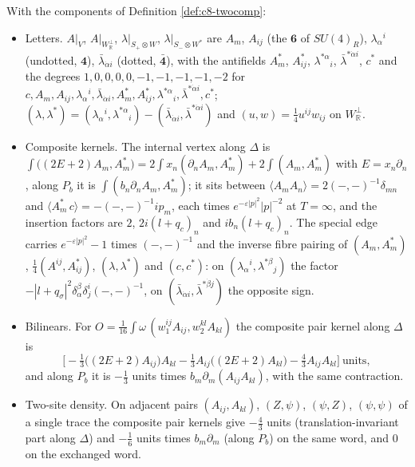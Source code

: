 \begin{remark}
\label{rem:c11-twocomp}
With the components of Definition \ref{def:c8-twocomp}:
\begin{itemize}
\item Letters. $A|_V$, $A|_{W_{\mathbb R}^\perp}$, $\lambda|_{S_+\otimes W}$, $\lambda|_{S_-\otimes W^*}$ are $A_m$, $A_{ij}$ (the $\mathbf 6$ of $SU(4)_R$), $\lambda_\alpha{}^i$ (undotted, $\mathbf 4$), $\bar\lambda_{\dot\alpha i}$ (dotted, $\bar{\mathbf 4}$), with the antifields $A^*_m$, $A^*_{ij}$, $\lambda^{*\alpha}{}_i$, $\bar\lambda^{*\dot\alpha i}$, $c^*$ and the degrees $1,0,0,0,0,-1,-1,-1,-1,-2$ for $c,A_m,A_{ij},\lambda_\alpha{}^i,\bar\lambda_{\dot\alpha i},A^*_m,A^*_{ij},\lambda^{*\alpha}{}_i,\bar\lambda^{*\dot\alpha i},c^*$; $(\lambda,\lambda^*)=(\lambda_\alpha{}^i,\lambda^{*\alpha}{}_i)-(\bar\lambda_{\dot\alpha i},\bar\lambda^{*\dot\alpha i})$ and $(u,w)=\tfrac14u^{ij}w_{ij}$ on $W_{\mathbb R}^\perp$.
\item Composite kernels. The internal vertex along $\Delta$ is $\int\big((2E+2)A_m,A^*_m\big)=2\int x_n(\partial_nA_m,A^*_m)+2\int(A_m,A^*_m)$ with $E=x_n\partial_n$, along $P_b$ it is $\int(b_n\partial_nA_m,A^*_m)$; it sits between $\langle A_mA_n\rangle=2(-,-)^{-1}\delta_{mn}$ and $\langle A^*_m\,c\rangle=-(-,-)^{-1}ip_m$, each times $e^{-\varepsilon|p|^2}|p|^{-2}$ at $T=\infty$, and the insertion factors are $2$, $2i(l+q_c)_n$ and $ib_n(l+q_c)_n$. The special edge carries $e^{-\varepsilon|p|^2}-1$ times $(-,-)^{-1}$ and the inverse fibre pairing of $(A_m,A^*_m)$, $\tfrac14(A^{ij},A^*_{ij})$, $(\lambda,\lambda^*)$ and $(c,c^*)$: on $(\lambda_\alpha{}^i,\lambda^{*\beta}{}_j)$ the factor $-|l+q_\sigma|^2\delta_\alpha^\beta\delta^i_j(-,-)^{-1}$, on $(\bar\lambda_{\dot\alpha i},\bar\lambda^{*\dot\beta j})$ the opposite sign.
\item Bilinears. For $O=\tfrac1{16}\int\omega\,(w_1^{ij}A_{ij},w_2^{kl}A_{kl})$ the composite pair kernel along $\Delta$ is
\[
\Big[-\tfrac13\big((2E+2)A_{ij}\big)A_{kl}-\tfrac13A_{ij}\big((2E+2)A_{kl}\big)-\tfrac43A_{ij}A_{kl}\Big]\ \text{units},
\]
and along $P_b$ it is $-\tfrac13$ units times $b_m\partial_m(A_{ij}A_{kl})$, with the same contraction.
\item Two-site density. On adjacent pairs $(A_{ij},A_{kl})$, $(Z,\psi)$, $(\psi,Z)$, $(\psi,\psi)$ of a single trace the composite pair kernels give $-\tfrac43$ units (translation-invariant part along $\Delta$) and $-\tfrac16$ units times $b_m\partial_m$ (along $P_b$) on the same word, and $0$ on the exchanged word.

\end{itemize}
\end{remark}
